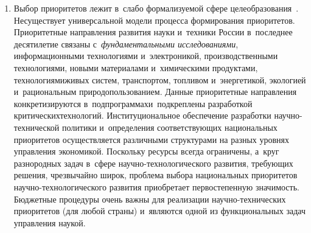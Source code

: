 \begin{multicols}{2}
\begin{enumerate}[1.]
    \item Выбор приоритетов лежит в~слабо формализуемой сфере 
целеобразования~\cite{8-sun, 11-sun, 12-sun}. Не\linebreak существует универсальной 
модели процесса формирования приоритетов. Приоритетные на\-прав\-ле\-ния 
развития науки и~техники России\linebreak
 в~последнее десятилетие связаны 
с~\textit{фундаментальными исследованиями}, информационными\linebreak 
технологиями и~электроникой, производственными технологиями, новыми 
материалами и~химическими продуктами, технологиями\linebreak живых сис\-тем, 
транспортом, топливом и~энергетикой, экологией и~рациональным 
природопользованием. Данные приоритетные на\-прав\-ле\-ния конкретизируются 
в~подпрограммах\linebreak и~подкреплены разработкой критических\linebreak технологий. 
Институциональное обеспечение\linebreak
 разработки на\-уч\-но-тех\-ни\-че\-ской 
политики и~определения соответствующих национальных приоритетов 
осуществляется различными структурами на разных уровнях управ\-ле\-ния 
экономикой. Поскольку ресурсы всегда ограничены, а~круг разнородных задач 
в~сфере на\-уч\-но-тех\-но\-ло\-ги\-че\-ско\-го развития, тре\-бу\-ющих решения, 
чрезвычайно широк, проб\-ле\-ма выбора национальных приоритетов  
на\-уч\-но-тех\-но\-ло\-ги\-че\-ско\-го развития приобретает первостепенную 
зна\-чи\-мость. Бюджетные процедуры очень важны для реализации  
на\-уч\-но-тех\-ни\-че\-ских приоритетов (для любой страны) и~являются 
одной из функциональных задач управ\-ле\-ния наукой.
\end{enumerate}
    

\end{multicols}
